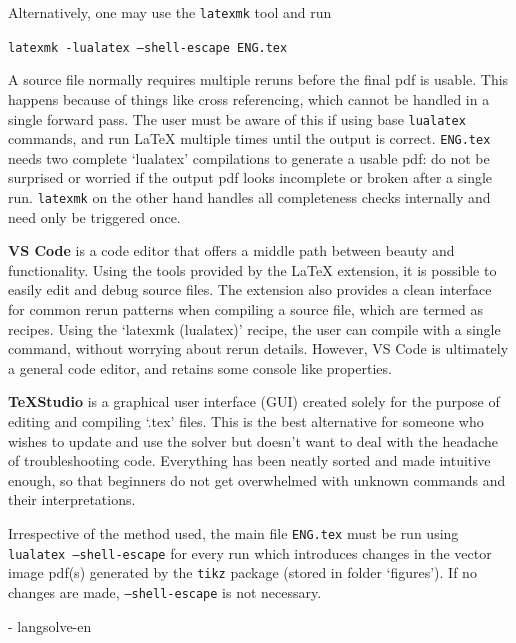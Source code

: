 \documentclass[12pt,letterpaper]{article}
\newenvironment{example}{\def\FrameCommand{\colorbox{sampler}} \MakeFramed{\advance\hsize+\width}\begin{center}}{\end{center}\endMakeFramed}
\begin{document}
Alternatively, one may use the \texttt{latexmk} tool and run
\begin{example}
    \texttt{latexmk -lualatex --shell-escape ENG.tex}
\end{example}

A  source file normally requires multiple reruns before the final pdf is usable. This happens because of things like cross referencing, which cannot be handled in a single forward pass. The user must be aware of this if using base \texttt{lualatex} commands, and run \LaTeX{} multiple times until the output is correct. \texttt{ENG.tex} needs two complete `lualatex' compilations to generate a usable pdf: do not be surprised or worried if the output pdf looks incomplete or broken after a single run. \texttt{latexmk} on the other hand handles all completeness checks internally and need only be triggered once.

\textbf{VS Code} is a code editor that offers a middle path between beauty and functionality. Using the tools provided by the \LaTeX{} extension, it is possible to easily edit and debug source files. The extension also provides a clean interface for common rerun patterns when compiling a source file, which are termed as  recipes. Using the `latexmk (lualatex)' recipe, the user can compile  with a single command, without worrying about rerun details. However, VS Code is ultimately a general code editor, and retains some console like properties.

\textbf{\TeX Studio} is a graphical user interface (GUI) created solely for the purpose of editing and compiling `.tex' files. This is the best alternative for someone who wishes to update and use the solver but doesn't want to deal with the headache of troubleshooting code. Everything has been  neatly sorted  and made intuitive enough, so that beginners do not get overwhelmed with unknown commands and their interpretations.

Irrespective of the method used, the main file \texttt{ENG.tex} must be run using \texttt{lualatex --shell-escape}  for every run which introduces changes in the vector image pdf(s) generated by the  \texttt{tikz} package (stored in folder `figures'). If no  changes are made, \texttt{--shell-escape} is not necessary.
\begin{center}
     - langsolve-en
\end{center}
\end{document}

